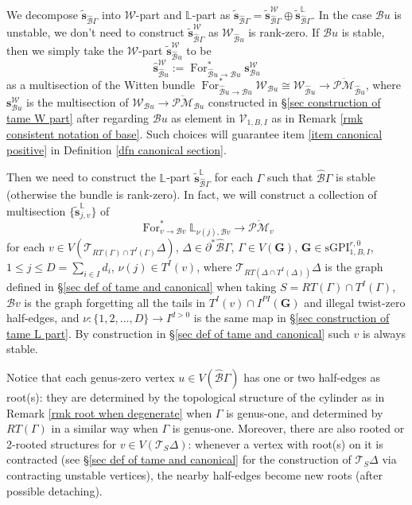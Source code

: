 \documentclass[11pt]{amsart}
\theoremstyle{definition}
\theoremstyle{remark}
\newcommand{\oPMb}{{\overline{\mathcal{PM}}}}
\newcommand{\<}{\left<}
\renewcommand{\>}{\right>}
\numberwithin{equation}{section}
\def\sGPI{\text{sGPI}}
\begin{document}
 We decompose $\tilde{\bm s}_{\hat{\mathcal B} \Gamma}$ into $\mathcal W$-part and $\mathbb L$-part as 
    $\tilde{\bm s}_{\hat{\mathcal B} \Gamma}=\tilde{\bm s}_{\hat{\mathcal B} \Gamma}^{\mathcal W}\oplus \tilde{\bm s}_{\hat{\mathcal B} \Gamma}^{\mathbb L}$. In the case $\mathcal B u$ is unstable, we don't need to construct $\tilde{\bm s}_{\hat{\mathcal B} \Gamma}^{\mathcal W}$ as $\mathcal W_{\hat{\mathcal B}u}$ is rank-zero. If  $\mathcal B u$ is stable, then we simply take the $\mathcal W$-part $\tilde{\bm s}_{\hat{\mathcal B} u}^{\mathcal W}$ to be
    $$
    \hat{\bm s}_{\hat{\mathcal B} u}^{\mathcal W}:= \operatorname{For}^*_{\hat{\mathcal B} u \to {\mathcal B} u} \bm{s}_{{\mathcal B} u}^{\mathcal W}
    $$
    as a multisection of the Witten bundle $\operatorname{For}^*_{\hat{\mathcal B} u \to {\mathcal B} u} \mathcal W_{{\mathcal B} u}\cong \mathcal W_{\hat{\mathcal B} u}\to \oPMb_{\hat{\mathcal B} u}$, where $\bm{s}_{{\mathcal B} u}^{\mathcal W}$ is the multisection of $\mathcal W_{\mathcal B u}\to \oPMb_{{\mathcal B} u}$ constructed in \S \ref{sec construction of tame W part} after regarding $\mathcal Bu$ as element in $\mathcal V_{1,B,I}$ as in Remark \ref{rmk consistent notation of base}. Such choices will guarantee item \ref{item canonical positive} in Definition \ref{dfn canonical section}. 


    Then we need to construct the $\mathbb L$-part $\tilde{\bm s}_{\hat{\mathcal B} \Gamma}^{\mathbb L}$ for each $\Gamma$ such that $\hat{\mathcal B} \Gamma$ is stable (otherwise the bundle is rank-zero). In fact, we will construct a collection of multisection $\{\tilde{\bm{s}}^{\mathbb L}_{j,v}\}$ of 
    $$
     \operatorname{For}^*_{v\to \mathcal B v}\mathbb L_{\nu(j),\mathcal B v} \to \oPMb_{v}
    $$
    for each $v\in V(\mathcal T_{RT(\Gamma)\cap T^I(\Gamma)} \Delta)$, $ \Delta\in \partial^* \hat{\mathcal B} \Gamma$, $\Gamma \in V(\bm{G})$, $\bm{G}\in \sGPI^{r,0}_{1,B,I}$, $1\le j \le D=\sum_{i\in I} d_i$, $\nu(j)\in T^I(v)$, where $\mathcal T_{RT(\Delta\cap T^I(\Delta))} \Delta$ is the graph defined in \S \ref{sec def of tame and canonical} when taking $S=RT(\Gamma)\cap T^I(\Gamma)$,  $\mathcal B v$ is the graph forgetting all the tails in $T^I(v)\cap I^{PI}(\bm{G})$ and illegal twist-zero half-edges, and $\nu\colon \{1,2,\dots,D\}\to I^{d>0}$ is the same map in \S \ref{sec construction of tame L part}. By construction in \S \ref{sec def of tame and canonical} such $v$ is always stable. 

     Notice that each genus-zero vertex $u\in V(\hat{\mathcal B}\Gamma)$ has one or two half-edges as root(s): they are determined by the topological structure of the cylinder as in Remark \ref{rmk root when degenerate} when $\Gamma$ is genus-one, and determined by $RT(\Gamma)$ in a similar way when $\Gamma$ is genus-one. Moreover, there are also rooted or 2-rooted structures for $v\in V(\mathcal T_{S} \Delta)$: whenever a vertex with root(s) on it is contracted (see \S \ref{sec def of tame and canonical} for the construction of $\mathcal T_{S} \Delta$ via contracting unstable vertices), the nearby half-edges become new roots (after possible detaching).
    
\end{document}
